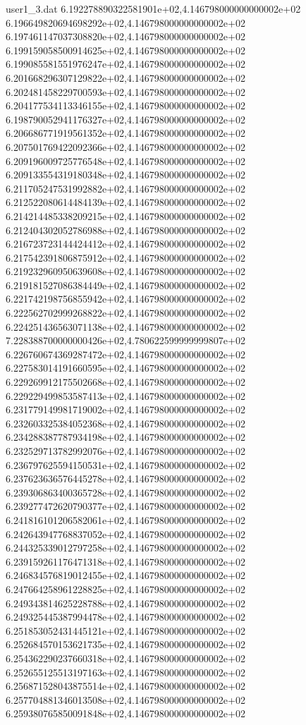 \begin{filecontents}{user1_3.dat}
6.192278890322581901e+02,4.146798000000000002e+02
6.196649820694698292e+02,4.146798000000000002e+02
6.197461147037308820e+02,4.146798000000000002e+02
6.199159058500914625e+02,4.146798000000000002e+02
6.199085581551976247e+02,4.146798000000000002e+02
6.201668296307129822e+02,4.146798000000000002e+02
6.202481458229700593e+02,4.146798000000000002e+02
6.204177534113346155e+02,4.146798000000000002e+02
6.198790052941176327e+02,4.146798000000000002e+02
6.206686771919561352e+02,4.146798000000000002e+02
6.207501769422092366e+02,4.146798000000000002e+02
6.209196009725776548e+02,4.146798000000000002e+02
6.209133554319180348e+02,4.146798000000000002e+02
6.211705247531992882e+02,4.146798000000000002e+02
6.212522080614484139e+02,4.146798000000000002e+02
6.214214485338209215e+02,4.146798000000000002e+02
6.212404302052786988e+02,4.146798000000000002e+02
6.216723723144424412e+02,4.146798000000000002e+02
6.217542391806875912e+02,4.146798000000000002e+02
6.219232960950639608e+02,4.146798000000000002e+02
6.219181527086384449e+02,4.146798000000000002e+02
6.221742198756855942e+02,4.146798000000000002e+02
6.222562702999268822e+02,4.146798000000000002e+02
6.224251436563071138e+02,4.146798000000000002e+02
7.228388700000000426e+02,4.780622599999999807e+02
6.226760674369287472e+02,4.146798000000000002e+02
6.227583014191660595e+02,4.146798000000000002e+02
6.229269912175502668e+02,4.146798000000000002e+02
6.229229499853587413e+02,4.146798000000000002e+02
6.231779149981719002e+02,4.146798000000000002e+02
6.232603325384052368e+02,4.146798000000000002e+02
6.234288387787934198e+02,4.146798000000000002e+02
6.232529713782992076e+02,4.146798000000000002e+02
6.236797625594150531e+02,4.146798000000000002e+02
6.237623636576445278e+02,4.146798000000000002e+02
6.239306863400365728e+02,4.146798000000000002e+02
6.239277472620790377e+02,4.146798000000000002e+02
6.241816101206582061e+02,4.146798000000000002e+02
6.242643947768837052e+02,4.146798000000000002e+02
6.244325339012797258e+02,4.146798000000000002e+02
6.239159261176471318e+02,4.146798000000000002e+02
6.246834576819012455e+02,4.146798000000000002e+02
6.247664258961228825e+02,4.146798000000000002e+02
6.249343814625228788e+02,4.146798000000000002e+02
6.249325445387994478e+02,4.146798000000000002e+02
6.251853052431445121e+02,4.146798000000000002e+02
6.252684570153621735e+02,4.146798000000000002e+02
6.254362290237660318e+02,4.146798000000000002e+02
6.252655125513197163e+02,4.146798000000000002e+02
6.256871528043875514e+02,4.146798000000000002e+02
6.257704881346013508e+02,4.146798000000000002e+02
6.259380765850091848e+02,4.146798000000000002e+02

\end{filecontents}
